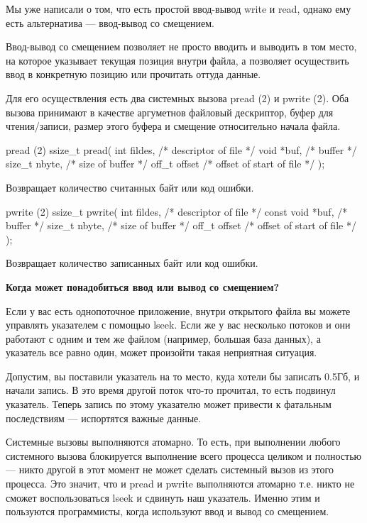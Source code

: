 Мы уже написали о том, что есть простой ввод-вывод write и read, однако ему есть альтернатива --- ввод-вывод со смещением. 

Ввод-вывод со смещением позволяет не просто вводить и выводить в том место, на которое указывает текущая позиция внутри файла, а позволяет осуществить ввод в конкретную позицию или прочитать оттуда данные.

Для его осуществления есть два системных вызова pread (2) и pwrite (2). Оба вызова принимают в качестве аргуметнов файловый дескриптор, буфер для чтения/записи, размер этого буфера и смещение относительно начала файла.

\begin{CCode}{pread (2)}
	ssize_t pread(
		int fildes, 	/* descriptor of file */
		void *buf,		/* buffer */
		size_t nbyte, 	/* size of buffer  */
		off_t offset	/* offset of start of file */
	); \end{CCode}
Возвращает количество считанных байт или код ошибки.

\begin{CCode}{pwrite (2)}
	ssize_t pwrite(
		int fildes, 		/* descriptor of file */
		const void *buf,	/* buffer */
		size_t nbyte,		/* size of buffer  */
		off_t offset		/* offset of start of file */
	); \end{CCode}
Возвращает количество записанных байт или код ошибки.

\textbf{Когда может понадобиться ввод или вывод со смещением?}

Если у вас есть однопоточное приложение, внутри открытого файла вы можете управлять указателем с помощью lseek. Если же у вас несколько потоков и они работают с одним и тем же файлом (например, большая база данных), а указатель все равно один, может произойти такая неприятная ситуация.

Допустим, вы поставили указатель на то место, куда хотели бы записать 0.5Гб, и начали запись. В это время другой поток что-то прочитал, то есть подвинул указатель. Теперь запись по этому указателю может привести к фатальным последствиям --- испортятся важные данные.

Системные вызовы выполняются атомарно. То есть, при выполнении любого системного вызова блокируется выполнение всего процесса целиком и полностью --- никто другой в этот момент не может сделать системный вызов из этого процесса. Это значит, что и pread и pwrite выполняются атомарно т.е. никто не сможет воспользоваться lseek и сдвинуть наш указатель. Именно этим и пользуются программисты, когда используют ввод и вывод со смещением.